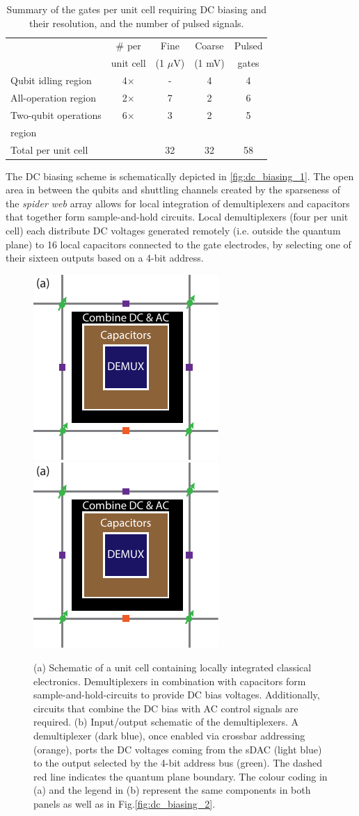 \documentclass[aps,prl,reprint,superscriptaddress,floatfix]{revtex4-1}
\begin{document}
\begin{table}[b]
    \centering
    \begin{tabular}{l|c||c|c||c}
         & \# per & Fine & Coarse & Pulsed \\
         & unit cell & (1 $\mu$V) & (1 mV) & gates \\
        \hline \hline
        Qubit idling region & 4$\times$ & - & 4 & 4 \\
        \hline
        All-operation region & 2$\times$ & 7 & 2 & 6 \\
        \hline
        Two-qubit operations & 6$\times$ & 3 & 2 & 5 \\
        region & & & & \\
        \hline \hline
        Total per unit cell & & 32 & 32 & 58
    \end{tabular}
    \caption{Summary of the gates per unit cell requiring DC biasing and their resolution, and the number of pulsed signals.}
    \label{tab:DC_AC_count}
\end{table}

The DC biasing scheme is schematically depicted in \autoref{fig:dc_biasing_1}.
The open area in between the qubits and shuttling channels created by the sparseness of the \textit{spider web} array allows for local integration of demultiplexers and capacitors that together form sample-and-hold circuits.
Local demultiplexers (four per unit cell) each distribute DC voltages generated remotely (i.e. outside the quantum plane) to 16 local capacitors connected to the gate electrodes, by selecting one of their sixteen outputs based on a 4-bit address.

\begin{figure}[t]
    \centering
    \includegraphics[height=0.2\textwidth,page=1]{Figure_3_DC_biasing_1.pdf}
    \includegraphics[height=0.2\textwidth,page=2]{Figure_3_DC_biasing_1.pdf}
    \caption{(a) Schematic of a unit cell containing locally integrated classical electronics. Demultiplexers in combination with capacitors form sample-and-hold-circuits to provide DC bias voltages. Additionally, circuits that combine the DC bias with AC control signals are required. (b) Input/output schematic of the demultiplexers. A demultiplexer (dark blue), once enabled via crossbar addressing (orange), ports the DC voltages coming from the sDAC (light blue) to the output selected by the 4-bit address bus (green). The dashed red line indicates the quantum plane boundary. The colour coding in (a) and the legend in (b) represent the same components in both panels as well as in Fig.\ref{fig:dc_biasing_2}.}
    \label{fig:dc_biasing_1}
\end{figure}
\end{document}

